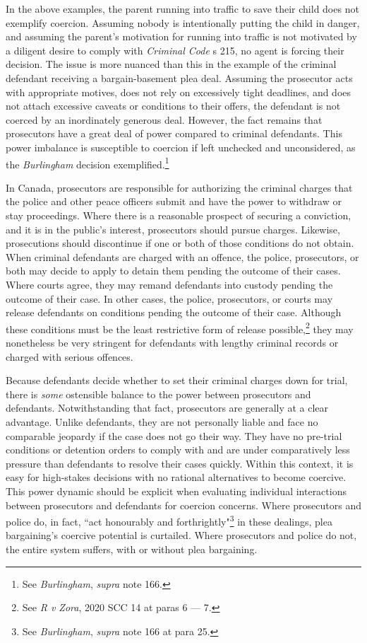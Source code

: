 In the above examples, the parent running into traffic to save their child does not exemplify coercion. Assuming nobody is intentionally putting the child in danger, and assuming the parent's motivation for running into traffic is not motivated by a diligent desire to comply with \textit{Criminal Code} s 215, no agent is forcing their decision. The issue is more nuanced than this in the example of the criminal defendant receiving a bargain-basement plea deal. Assuming the prosecutor acts with appropriate motives, does not rely on excessively tight deadlines, and does not attach excessive caveats or conditions to their offers, the defendant is not coerced by an inordinately generous deal. However, the fact remains that prosecutors have a great deal of power compared to criminal defendants. This power imbalance is susceptible to coercion if left unchecked and unconsidered, as the \textit{Burlingham} decision exemplified.\footnote{See \textit{Burlingham}, \textit{supra} note 166.}

In Canada, prosecutors are responsible for authorizing the criminal charges that the police and other peace officers submit and have the power to withdraw or stay proceedings. Where there is a reasonable prospect of securing a conviction, and it is in the public's interest, prosecutors should pursue charges. Likewise, prosecutions should discontinue if one or both of those conditions do not obtain. When criminal defendants are charged with an offence, the police, prosecutors, or both may decide to apply to detain them pending the outcome of their cases. Where courts agree, they may remand defendants into custody pending the outcome of their case. In other cases, the police, prosecutors, or courts may release defendants on conditions pending the outcome of their case. Although these conditions must be the least restrictive form of release possible,\footnote{See \textit{R v Zora}, 2020 SCC 14 at paras 6 — 7.} they may nonetheless be very stringent for defendants with lengthy criminal records or charged with serious offences.

Because defendants decide whether to set their criminal charges down for trial, there is \textit{some} ostensible balance to the power between prosecutors and defendants. Notwithstanding that fact, prosecutors are generally at a clear advantage. Unlike defendants, they are not personally liable and face no comparable jeopardy if the case does not go their way. They have no pre-trial conditions or detention orders to comply with and are under comparatively less pressure than defendants to resolve their cases quickly. Within this context, it is easy for high-stakes decisions with no rational alternatives to become coercive. This power dynamic should be explicit when evaluating individual interactions between prosecutors and defendants for coercion concerns. Where prosecutors and police do, in fact, ``act honourably and forthrightly"\footnote{See \textit{Burlingham}, \textit{supra} note 166 at para 25.} in these dealings, plea bargaining's coercive potential is curtailed. Where prosecutors and police do not, the entire system suffers, with or without plea bargaining.

